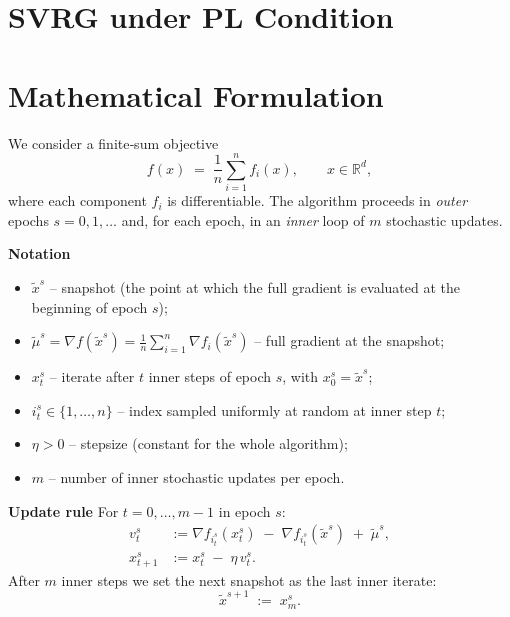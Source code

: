 \documentclass[11pt]{article}
\newcommand{\RR}{\mathbb{R}}
\begin{document}
\section*{SVRG under PL Condition}

\section*{Mathematical Formulation}
We consider a finite‑sum objective
\[
f(x)\;=\;\frac{1}{n}\sum_{i=1}^{n}f_i(x),\qquad x\in\RR^{d},
\]
where each component $f_i$ is differentiable.  
The algorithm proceeds in \emph{outer} epochs $s=0,1,\dots$ and, for each epoch, in an \emph{inner} loop of $m$ stochastic updates.

\medskip
\noindent\textbf{Notation}
\begin{itemize}[leftmargin=*]
    \item $\tilde{x}^{s}$ – snapshot (the point at which the full gradient is evaluated at the beginning of epoch $s$);
    \item $\tilde{\mu}^{s}= \nabla f(\tilde{x}^{s})= \frac{1}{n}\sum_{i=1}^{n}\nabla f_i(\tilde{x}^{s})$ – full gradient at the snapshot;
    \item $x_{t}^{s}$ – iterate after $t$ inner steps of epoch $s$, with $x_{0}^{s}=\tilde{x}^{s}$;
    \item $i_{t}^{s}\in\{1,\dots,n\}$ – index sampled uniformly at random at inner step $t$;
    \item $\eta>0$ – stepsize (constant for the whole algorithm);
    \item $m$ – number of inner stochastic updates per epoch.
\end{itemize}

\medskip
\noindent\textbf{Update rule}
For $t=0,\dots,m-1$ in epoch $s$:
\begin{align}
    v_{t}^{s} &:= \nabla f_{i_{t}^{s}}(x_{t}^{s})\;-\;\nabla f_{i_{t}^{s}}(\tilde{x}^{s})\;+\;\tilde{\mu}^{s}, \tag{1}\\[4pt]
    x_{t+1}^{s} &:= x_{t}^{s}\;-\;\eta\, v_{t}^{s}. \tag{2}
\end{align}
After $m$ inner steps we set the next snapshot as the last inner iterate:
\[
\tilde{x}^{s+1}\;:=\;x_{m}^{s}. \tag{3}
\]
\end{document}
